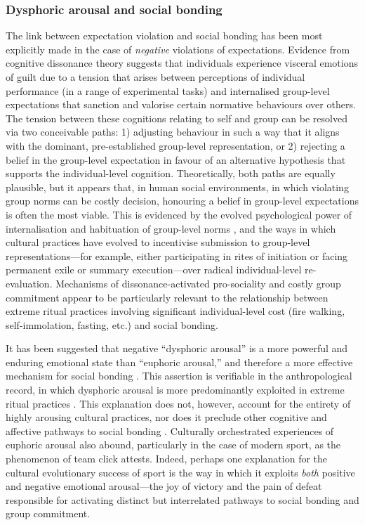 \subsubsection{Dysphoric arousal and social bonding}
The link between expectation violation and social bonding has been most explicitly made in the case of \textit{negative} violations of expectations.  Evidence from cognitive dissonance theory \citep{Festinger1957} suggests that individuals experience visceral emotions of guilt due to a tension that arises between perceptions of individual performance (in a range of experimental tasks) and internalised group-level expectations that sanction and valorise certain normative behaviours over others\citep{Kenworthy2011,Stone2001}.  The tension between these cognitions relating to self and group can be resolved via two conceivable paths: 1) adjusting behaviour in such a way that it aligns with the dominant, pre-established group-level representation, or 2) rejecting a belief in the group-level expectation in favour of an alternative hypothesis that supports the individual-level cognition.
Theoretically, both paths are equally plausible, but it appears that, in human social environments, in which violating group norms can be costly decision, honouring a belief in group-level expectations is often the most viable.  This is evidenced by the evolved psychological power of internalisation and habituation of group-level norms \citep{Chudek2011}, and the ways in which cultural practices have evolved to incentivise submission to group-level representations---for example, either participating in rites of initiation or facing permanent exile or summary execution\citep[cf.][18]{Whitehouse2014}---over radical individual-level re-evaluation\citep{Sosis2003}.
Mechanisms of dissonance-activated pro-sociality and costly group commitment appear to be particularly relevant to the relationship between extreme ritual practices involving significant individual-level cost (fire walking, self-immolation, fasting, etc.) and social bonding\citep{Sosis2003,Xygalatas2013,Bastian2014,Fischer2014,Whitehouse2014}.

It has been suggested that negative ``dysphoric arousal'' is a more powerful and enduring emotional state than ``euphoric arousal,'' and therefore a more effective mechanism for social bonding \citep{Whitehouse1996,Whitehouse2004}.  This assertion is verifiable in the anthropological record, in which dysphoric arousal is more predominantly exploited in extreme ritual practices \citep{Atkinson2011,Whitehouse2014}. This explanation does not, however, account for the entirety of highly arousing cultural practices, nor does it preclude other cognitive and affective pathways to social bonding \citep{Downey2014,Xygalatas2014,Fischer2014,Fischer2014a}.  Culturally orchestrated experiences of euphoric arousal also abound, particularly in the case of modern sport, as the phenomenon of team click attests. Indeed, perhaps one explanation for the cultural evolutionary success of sport is the way in which it exploits \textit{both} positive and negative emotional arousal---the joy of victory and the pain of defeat responsible for activating distinct but interrelated pathways to social bonding and group commitment.


